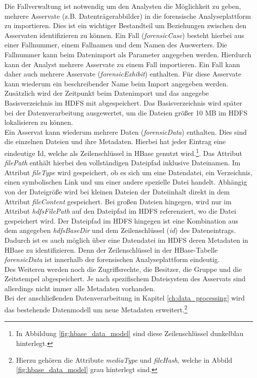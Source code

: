 \noindent
Die Fallverwaltung ist notwendig um den Analysten die Möglichkeit zu geben, mehrere Asservate (z.B. Datenträgerabbilder) in die forensische Analyseplattform zu importieren. Dies ist ein wichtiger Bestandteil um Beziehungen zwischen den Asservaten identifizieren zu können. Ein Fall (\textit{forensicCase}) besteht hierbei aus einer Fallnummer, einem Fallnamen und dem Namen des Auswerters. Die Fallnummer kann beim Datenimport als Parameter angegeben werden. Hierdurch kann der Analyst mehrere Asservate zu einem Fall importieren. Ein Fall kann daher auch mehrere Asservate (\textit{forensicExhibit}) enthalten. Für diese Asservate kann wiederum ein beschreibender Name beim Import angegeben werden. Zusätzlich wird der Zeitpunkt beim Datenimport und das angegebe Basisverzeichnis im HDFS mit abgespeichert. Das Basisverzeichnis wird später bei der Datenverarbeitung ausgewertet, um die Dateien größer 10 MB im HDFS lokalisieren zu können.\\

\noindent
Ein Asservat kann wiederum mehrere Daten (\textit{forensicData}) enthalten. Dies sind die einzelnen Dateien und ihre Metadaten. Hierbei hat jeder Eintrag eine eindeutige Id, welche als Zeilenschlüssel in HBase genutzt wird.\footnote{In Abbildung \ref{fig:hbase_data_model} sind diese Zeilenschlüssel dunkelblau hinterlegt.}. Das Attribut \textit{filePath} enthält hierbei den vollständigen Dateipfad inklusive Dateinamen. 
Im Attribut \textit{fileType} wird gespeichert, ob es sich um eine Datendatei, ein Verzeichnis, einen symbolischen Link und um einer andere spezielle Datei handelt. Abhängig von der Dateigröße wird bei kleinen Dateien der Dateiinhalt direkt in dem Attribut \textit{fileContent} gespeichert. Bei großen Dateien hingegen, wird nur im Attribut \textit{hdfsFilePath} auf den Dateipfad im HDFS referenziert, wo die Datei gespeichert wird. Der Dateipfad im HDFS hingegen ist eine Kombination aus dem angegeben \textit{hdfsBaseDir} und dem Zeilenschlüssel (\textit{id}) des Dateneintrags. Dadurch ist es auch möglich über eine Datendatei im HDFS deren Metadaten in HBase zu identifizieren. Denn der Zeilenschlüssel in der HBase-Tabelle \textit{forensicData} ist innerhalb der forensischen Analyseplattform eindeutig.\\
Des Weiteren werden noch die Zugriffsrechte, die Besitzer, die Gruppe und die Zeitstempel abgespeichert. Je nach spezifischem Dateisystem des Asservats sind allerdings nicht immer alle Metadaten vorhanden.\\
Bei der anschließenden Datenverarbeitung in Kapitel \ref{ch:data_processing} wird das bestehende Datenmodell um neue Metadaten erweitert.\footnote{Hierzu gehören die Attribute \textit{mediaType} und \textit{fileHash}, welche in Abbild \ref{fig:hbase_data_model} grau hinterlegt sind.}

